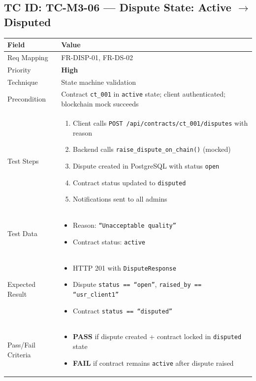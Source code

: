 \documentclass[12pt,a4paper]{article}
\newcommand{\sevhigh}{\textcolor{severityhigh}{\textbf{High}}}
\newcommand{\passresult}{\textcolor{passgreen}{\textbf{PASS}}}
\newcommand{\failresult}{\textcolor{failred}{\textbf{FAIL}}}
\begin{document}
\vspace{0.8cm}

\subsection{TC ID: TC-M3-06 --- Dispute State: Active $\rightarrow$ Disputed}

\begin{tabular}{|p{}|p{}|}
\hline
\rowcolor{lightblue} \textbf{Field} & \textbf{Value} \\
\hline
Req Mapping & FR-DISP-01, FR-DS-02 \\
\hline
Priority & \sevhigh \\
\hline
Technique & State machine validation \\
\hline
Precondition & Contract \texttt{ct\_001} in \texttt{active} state; client authenticated; blockchain mock succeeds \\
\hline
Test Steps &
\begin{enumerate}[nosep, leftmargin=*]
  \item Client calls \texttt{POST /api/contracts/ct\_001/disputes} with reason
  \item Backend calls \texttt{raise\_dispute\_on\_chain()} (mocked)
  \item Dispute created in PostgreSQL with status \texttt{open}
  \item Contract status updated to \texttt{disputed}
  \item Notifications sent to all admins
\end{enumerate} \\
\hline
Test Data &
\begin{itemize}[nosep, leftmargin=*]
  \item Reason: \texttt{``Unacceptable quality''}
  \item Contract status: \texttt{active}
\end{itemize} \\
\hline
Expected Result &
\begin{itemize}[nosep, leftmargin=*]
  \item HTTP 201 with \texttt{DisputeResponse}
  \item Dispute \texttt{status == ``open''}, \texttt{raised\_by == ``usr\_client1''}
  \item Contract \texttt{status == ``disputed''}
\end{itemize} \\
\hline
Pass/Fail Criteria &
\begin{itemize}[nosep, leftmargin=*]
  \item \passresult{} if dispute created + contract locked in \texttt{disputed} state
  \item \failresult{} if contract remains \texttt{active} after dispute raised
\end{itemize} \\
\hline
\end{tabular}
\end{document}
